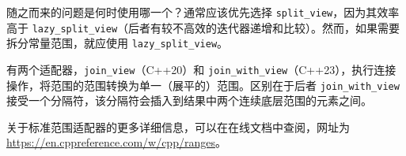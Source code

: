 随之而来的问题是何时使用哪一个？通常应该优先选择 \verb|split_view|，因为其效率高于 \verb|lazy_split_view|（后者有较不高效的迭代器递增和比较）。然而，如果需要拆分常量范围，就应使用 \verb|lazy_split_view|。

有两个适配器，\verb|join_view|（C++20）和 \verb|join_with_view|（C++23），执行连接操作，将范围的范围转换为单一（展平的）范围。区别在于后者 \verb|join_with_view| 接受一个分隔符，该分隔符会插入到结果中两个连续底层范围的元素之间。

关于标准范围适配器的更多详细信息，可以在在线文档中查阅，网址为 \url{https://en.cppreference.com/w/cpp/ranges}。

